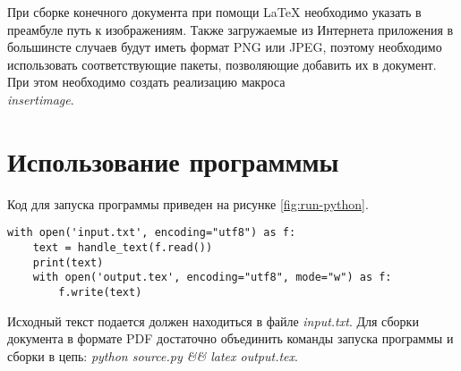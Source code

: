 При сборке конечного документа при помощи LaTeX необходимо указать в преамбуле
путь к изображениям. Также загружаемые из Интернета приложения в большинсте
случаев будут иметь формат PNG или JPEG, поэтому необходимо использовать
соответствующие пакеты, позволяющие добавить их в документ. При этом необходимо
создать реализацию макроса \emph{\\insertimage}.

\section{Использование программмы}

Код для запуска программы приведен на рисунке \ref{fig:run-python}.

\begin{codewrap}[0.65]
\begin{verbatim}
with open('input.txt', encoding="utf8") as f:
    text = handle_text(f.read())
    print(text)
    with open('output.tex', encoding="utf8", mode="w") as f:
        f.write(text)
\end{verbatim}
\caption{}\label{fig:run-python}
\end{codewrap}

Исходный текст подается должен находиться в файле \emph{input.txt}. Для сборки
документа в формате PDF достаточно объединить команды запуска программы и сборки
в цепь: \emph{python source.py \&\& latex output.tex}.
